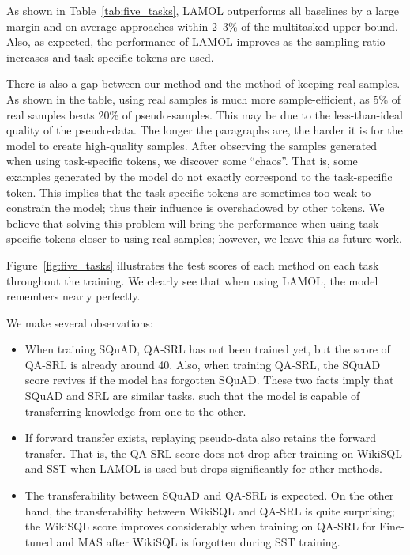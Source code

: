 \documentclass{article} \usepackage{iclr2020_conference,times}
\begin{document}
As shown in Table~\ref{tab:five_tasks}, LAMOL outperforms all baselines by a large margin and on average approaches within 2--3\% of the multitasked upper bound.
Also, as expected, the performance of LAMOL improves as the sampling ratio  increases and task-specific tokens are used.

There is also a gap between our method and the method of keeping real samples.
As shown in the table, using real samples is much more sample-efficient, as 5\% of real samples beats 20\% of pseudo-samples.
This may be due to the less-than-ideal quality of the pseudo-data.
The longer the paragraphs are, the harder it is for the model to create high-quality samples.
After observing the samples generated when using task-specific tokens, we discover some ``chaos''.
That is, some examples generated by the model do not exactly correspond to the task-specific token.
This implies that the task-specific tokens are sometimes too weak to constrain the model; thus their influence is overshadowed by other tokens.
We believe that solving this problem will bring the performance when using task-specific tokens closer to using real samples; however, we leave this as future work. 

Figure~\ref{fig:five_tasks} illustrates the test scores of each method on each task throughout the training.
We clearly see that when using LAMOL, the model remembers nearly perfectly.

We make several observations:
\begin{itemize}
    \item When training SQuAD, QA-SRL has not been trained yet, but the score of QA-SRL is already around 40.
    Also, when training QA-SRL, the SQuAD score revives if the model has forgotten SQuAD.
    These two facts imply that SQuAD and SRL are similar tasks, such that the model is capable of transferring knowledge from one to the other.
    \item If forward transfer exists, replaying pseudo-data also retains the forward transfer. That is, the QA-SRL score does not drop after training on WikiSQL and SST when LAMOL is used but drops significantly for other methods.
    \item The transferability between SQuAD and QA-SRL is expected. 
On the other hand, the transferability between WikiSQL and QA-SRL is quite surprising; the WikiSQL score improves considerably when training on QA-SRL for Fine-tuned and MAS after WikiSQL is forgotten during SST training. 
\end{itemize}
\end{document}
